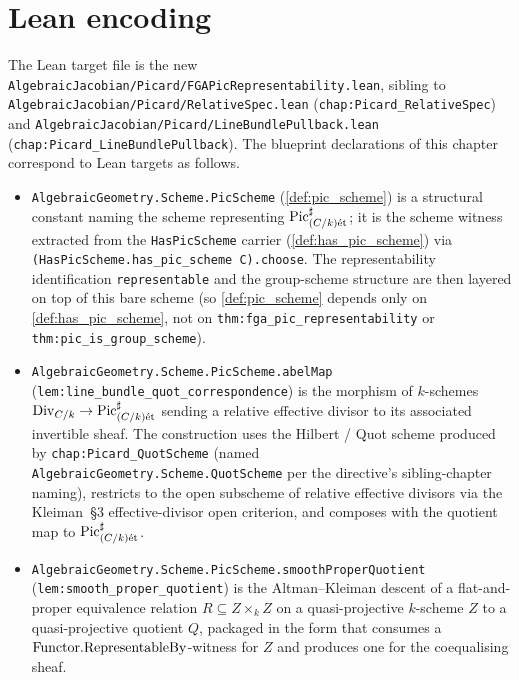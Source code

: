 \section{Lean encoding}
\label{sec:fga_pic_lean_encoding}

The Lean target file is the new
\texttt{AlgebraicJacobian/Picard/FGAPicRepresentability.lean}, sibling to
\texttt{AlgebraicJacobian/Picard/RelativeSpec.lean}
(\texttt{chap:Picard_RelativeSpec}) and
\texttt{AlgebraicJacobian/Picard/LineBundlePullback.lean}
(\texttt{chap:Picard_LineBundlePullback}). The blueprint declarations of
this chapter correspond to Lean targets as follows.

\begin{itemize}
  \item \texttt{AlgebraicGeometry.Scheme.PicScheme}
    (\cref{def:pic_scheme}) is a structural constant naming the scheme
    representing \(\operatorname{Pic}^\sharp_{(C/k)\mathrm{\acute{e}t}}\); it is the scheme witness
    extracted from the \texttt{HasPicScheme} carrier
    (\cref{def:has_pic_scheme}) via \texttt{(HasPicScheme.has\_pic\_scheme
    C).choose}. The representability identification \texttt{representable}
    and the group-scheme structure are then layered on top of this bare
    scheme (so \cref{def:pic_scheme} depends only on \cref{def:has_pic_scheme},
    not on \texttt{thm:fga_pic_representability} or
    \texttt{thm:pic_is_group_scheme}).
  \item \texttt{AlgebraicGeometry.Scheme.PicScheme.abelMap}
    (\texttt{lem:line_bundle_quot_correspondence}) is the morphism of
    \(k\)-schemes \(\mathrm{Div}_{C/k} \to \operatorname{Pic}^\sharp_{(C/k)\mathrm{\acute{e}t}}\) sending a
    relative effective divisor to its associated invertible sheaf.
    The construction uses the Hilbert / Quot scheme produced by
    \texttt{chap:Picard_QuotScheme} (named
    \texttt{AlgebraicGeometry.Scheme.QuotScheme} per the directive's
    sibling-chapter naming), restricts to the open subscheme of relative
    effective divisors via the Kleiman~\S 3 effective-divisor open
    criterion, and composes with the quotient map to
    \(\operatorname{Pic}^\sharp_{(C/k)\mathrm{\acute{e}t}}\).
  \item \texttt{AlgebraicGeometry.Scheme.PicScheme.smoothProperQuotient}
    (\texttt{lem:smooth_proper_quotient}) is the Altman--Kleiman
    descent of a flat-and-proper equivalence relation \(R \subseteq Z
    \times_k Z\) on a quasi-projective \(k\)-scheme \(Z\) to a
    quasi-projective quotient \(Q\), packaged in the form that consumes
    a \(\mathrm{Functor}.\mathrm{RepresentableBy}\)-witness for \(Z\) and produces
    one for the coequalising sheaf.

\end{itemize}
